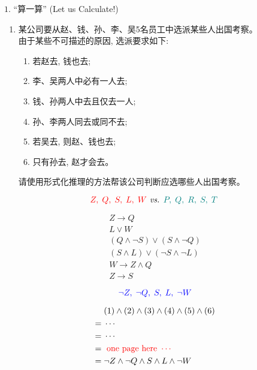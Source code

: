\begin{frame}{}
  \begin{exampleblock}{$1.$ ``算一算'' (Let us Calculate!)}	
    \begin{enumerate}[(1)]
      \item 某公司要从赵、钱、孙、李、吴5名员工中选派某些人出国考察。\\
	由于某些不可描述的原因, 选派要求如下:

	\begin{enumerate}[(1)]
	  \item 若赵去, 钱也去;
	  \item 李、吴两人中必有一人去; 
	  \item 钱、孙两人中去且仅去一人; 
	  \item 孙、李两人同去或同不去; 
	  \item 若吴去, 则赵、钱也去;
	  \item 只有孙去, 赵才会去。
	\end{enumerate}

	请使用形式化推理的方法帮该公司判断应选哪些人出国考察。
    \end{enumerate}
  \end{exampleblock}

  \pause
  \vspace{0.30cm}
  \[
    \textcolor{red}{Z,\; Q,\; S,\; L,\; W} \emph{ vs. } \textcolor{teal}{P,\; Q,\; R,\; S,\; T\;}
  \]
\end{frame}

\begin{frame}{}
  \setlength{\jot}{1.5ex}
  \begin{gather}
    Z \to Q \\
    L \lor W \\
    (Q \land \lnot S) \lor (S \land \lnot Q) \\
    (S \land L) \lor (\lnot S \land \lnot L) \\
    W \to Z \land Q \\
    Z \to S
  \end{gather}

  \pause
  \vspace{0.60cm}
  \[
    \textcolor{blue}{\lnot Z,\; \lnot Q,\; S,\; L,\; \lnot W}
  \]
\end{frame}

\begin{frame}{}
  \setlength{\jot}{1.5ex}
  \begin{align*}
    & (1) \land (2) \land (3) \land (4) \land (5) \land (6) \\
    =\; & \cdots \\
    =\; & \cdots \\
    =\; & \textcolor{red}{\text{ one page here } \cdots } \\
    =\; & \lnot Z \land \lnot Q \land S \land L \land \lnot W
  \end{align*}

  \pause
\end{frame}

